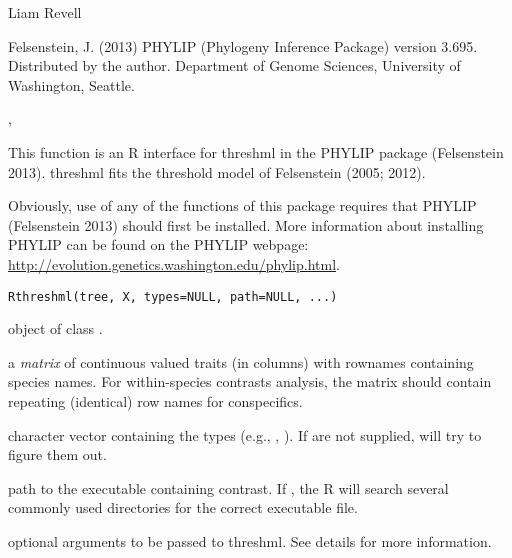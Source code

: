 \documentclass[a4paper]{book}
\begin{document}
%
\begin{Author}\relax
Liam Revell 
\end{Author}
%
\begin{References}\relax
Felsenstein, J. (2013) PHYLIP (Phylogeny Inference Package) version 3.695. Distributed by the author. Department of Genome Sciences, University of Washington, Seattle.
\end{References}
%
\begin{SeeAlso}\relax
{}, 
\end{SeeAlso}
%
\begin{Description}\relax
This function is an R interface for threshml in the PHYLIP package (Felsenstein 2013). threshml fits the threshold model of Felsenstein (2005; 2012).

Obviously, use of any of the functions of this package requires that PHYLIP (Felsenstein 2013) should first be installed. More information about installing PHYLIP can be found on the PHYLIP webpage: \url{http://evolution.genetics.washington.edu/phylip.html}.
\end{Description}
%
\begin{Usage}
\begin{verbatim}
Rthreshml(tree, X, types=NULL, path=NULL, ...)
\end{verbatim}
\end{Usage}
%
\begin{Arguments}
\begin{ldescription}
\item[\code{tree}] object of class .
\item[\code{X}] a \emph{matrix} of continuous valued traits (in columns) with rownames containing species names. For within-species contrasts analysis, the matrix should contain repeating (identical) row names for conspecifics.
\item[\code{types}] character vector containing the types (e.g., , ). If  are not supplied,  will try to figure them out.
\item[\code{path}] path to the executable containing contrast. If , the R will search several commonly used directories for the correct executable file.
\item[\code{...}] optional arguments to be passed to threshml. See details for more information.
\end{ldescription}
\end{Arguments}
\end{document}
